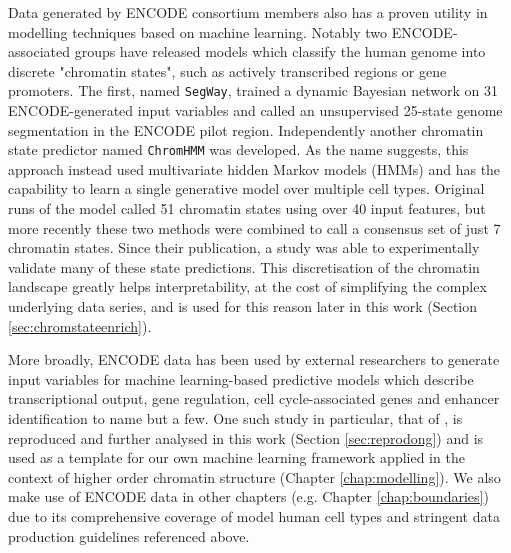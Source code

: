\documentclass[a4paper,11pt,oneside]{book}
\begin{document}
Data generated by ENCODE consortium members also has a proven utility in modelling techniques based on machine learning. Notably two ENCODE-associated groups have released models which classify the human genome into discrete "chromatin states", such as actively transcribed regions or gene promoters. The first, named \texttt{SegWay}, trained a dynamic Bayesian network on  31 ENCODE-generated input variables and called an unsupervised 25-state genome segmentation in the ENCODE pilot region.\cite{Hoffman2012} Independently another chromatin state predictor named \texttt{ChromHMM} was developed.\cite{Ernst2011, Ernst2012} As the name suggests, this approach instead used multivariate hidden Markov models (HMMs) and has the capability to learn a single generative model over multiple cell types. Original runs of the model called 51 chromatin states using over 40 input features,\cite{Ernst2010a} but more recently these two methods were combined to call a consensus set of just 7 chromatin states.\cite{Hoffman2013} Since their publication, a study was able to experimentally validate many of these state predictions.\cite{Kwasnieski2014} This discretisation of the chromatin landscape greatly helps interpretability, at the cost of simplifying the complex underlying data series, and is used for this reason later in this work (Section \ref{sec:chromstateenrich}). 

More broadly, ENCODE data has been used by external researchers to generate input variables for machine learning-based predictive models which describe transcriptional output,\cite{Cheng2011} gene regulation,\cite{Althammer2012} cell cycle-associated genes \cite{Cheng2013} and enhancer identification\cite{Rajagopal2013} to name but a few. One such study in particular, that of \citet{Dong2012}, is reproduced and further analysed in this work (Section \ref{sec:reprodong}) and is used as a template for our own machine learning framework applied in the context of higher order chromatin structure (Chapter \ref{chap:modelling}). We also make use of ENCODE data in other chapters (e.g. Chapter \ref{chap:boundaries}) due to its comprehensive coverage of model human cell types and stringent data production guidelines referenced above.

\end{document}
